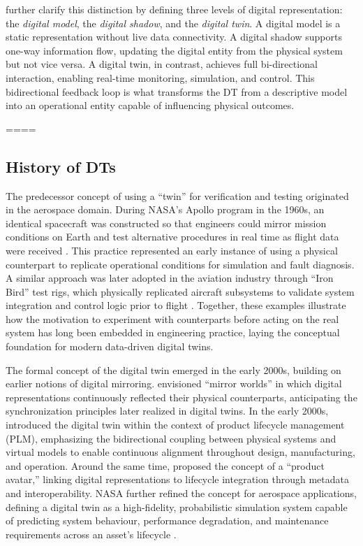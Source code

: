\citet{kritzinger2018digital} further clarify this distinction by defining three levels of digital representation: the \textit{digital model}, the \textit{digital shadow}, and the \textit{digital twin}. 
A digital model is a static representation without live data connectivity. 
A digital shadow supports one-way information flow, updating the digital entity from the physical system but not vice versa. 
A digital twin, in contrast, achieves full bi-directional interaction, enabling real-time monitoring, simulation, and control. 
This bidirectional feedback loop is what transforms the DT from a descriptive model into an operational entity capable of influencing physical outcomes.



====
\subsection{History of DTs}\label{subsec:background-dt-history}
The predecessor concept of using a “twin” for verification and testing originated in the aerospace domain. During NASA’s Apollo program in the 1960s, an identical spacecraft was constructed so that engineers could mirror mission conditions on Earth and test alternative procedures in real time as flight data were received \cite{boschert2016digital}. This practice represented an early instance of using a physical counterpart to replicate operational conditions for simulation and fault diagnosis. A similar approach was later adopted in the aviation industry through “Iron Bird” test rigs, which physically replicated aircraft subsystems to validate system integration and control logic prior to flight \cite{boschert2016digital}. Together, these examples illustrate how the motivation to experiment with counterparts before acting on the real system has long been embedded in engineering practice, laying the conceptual foundation for modern data-driven digital twins.

The formal concept of the digital twin emerged in the early 2000s, building on earlier notions of digital mirroring. \citet{gelernter1993mirror} envisioned “mirror worlds” in which digital representations continuously reflected their physical counterparts, anticipating the synchronization principles later realized in digital twins. In the early 2000s, \citet{grieves2005product} introduced the digital twin within the context of product lifecycle management (PLM), emphasizing the bidirectional coupling between physical systems and virtual models to enable continuous alignment throughout design, manufacturing, and operation. Around the same time, \citet{hribernik2006product} proposed the concept of a “product avatar,” linking digital representations to lifecycle integration through metadata and interoperability. NASA further refined the concept for aerospace applications, defining a digital twin as a high-fidelity, probabilistic simulation system capable of predicting system behaviour, performance degradation, and maintenance requirements across an asset’s lifecycle \cite{nasaprocessroadmap, glaessgen2012digital}.

